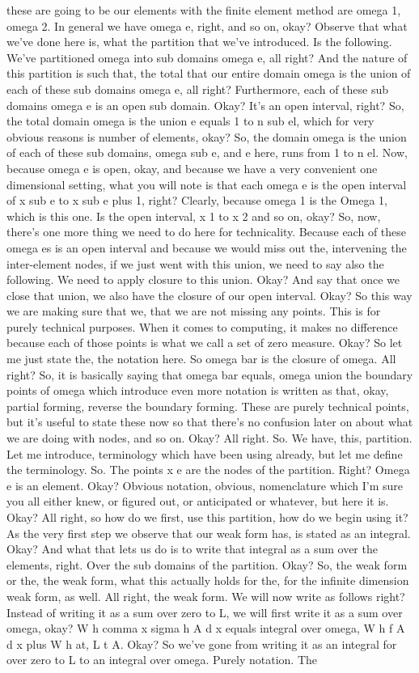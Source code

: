 \documentclass[10pt]{article}
\begin{document}
these are going to be our elements with the finite element method are omega 1, omega 2. In general we have omega e, right, and so on, okay? Observe that what we've done here is, what the partition that we've introduced. Is the following. We've partitioned omega into sub domains omega e, all right? And the nature of this partition is such that, the total that our entire domain omega is the union of each of these sub domains omega e, all right? Furthermore, each of these sub domains omega e is an open sub domain. Okay? It's an open interval, right? So, the total domain omega is the union e equals 1 to n sub el, which for very obvious reasons is number of elements, okay? So, the domain omega is the union of each of these sub domains, omega sub e, and e here, runs from 1 to n el. Now, because omega e is open, okay, and because we have a very convenient one dimensional setting, what you will note is that each omega e is the open interval of x sub e to x sub e plus 1, right? Clearly, because omega 1 is the Omega 1, which is this one. Is the open interval, x 1 to x 2 and so on, okay? So, now, there's one more thing we need to do here for technicality. Because each of these omega es is an open interval and because we would miss out the, intervening the inter-element nodes, if we just went with this union, we need to say also the following. We need to apply closure to this union. Okay? And say that once we close that union, we also have the closure of our open interval. Okay? So this way we are making sure that we, that we are not missing any points. This is for purely technical purposes. When it comes to computing, it makes no difference because each of those points is what we call a set of zero measure. Okay? So let me just state the, the notation here. So omega bar is the closure of omega. All right? So, it is basically saying that omega bar equals, omega union the boundary points of omega which introduce even more notation is written as that, okay, partial forming, reverse the boundary forming. These are purely technical points, but it's useful to state these now so that there's no confusion later on about what we are doing with nodes, and so on. Okay? All right. So. We have, this, partition. Let me introduce, terminology which have been using already, but let me define the terminology. So. The points x e are the nodes of the partition. Right? Omega e is an element. Okay? Obvious notation, obvious, nomenclature which I'm sure you all either knew, or figured out, or anticipated or whatever, but here it is. Okay? All right, so how do we first, use this partition, how do we begin using it? As the very first step we observe that our weak form has, is stated as an integral. Okay? And what that lets us do is to write that integral as a sum over the elements, right. Over the sub domains of the partition. Okay? So, the weak form or the, the  weak form, what this actually holds for the, for the infinite dimension weak form, as well. All right, the weak form. We will now write as follows right? Instead of writing it as a sum over zero to L, we will first write it as a sum over omega, okay? W h comma x sigma h A d x equals integral over omega, W h f A d x plus W h at, L t A. Okay? So we've gone from writing it as an integral for over zero to L to an integral over omega. Purely notation. The 
\end{document}
